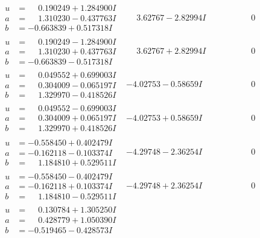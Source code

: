 \documentclass[1p]{elsarticle_modified}
\theoremstyle{definition}
\begin{document}
$$\begin{array}{c|c|c}
\begin{aligned}
u &= \phantom{-}0.190249 + 1.284900 I \\
a &= \phantom{-}1.310230 - 0.437763 I \\
b &= -0.663839 + 0.517318 I\end{aligned}
 & \phantom{-}3.62767 - 2.82994 I & \phantom{-0.000000 } 0 \\ \hline\begin{aligned}
u &= \phantom{-}0.190249 - 1.284900 I \\
a &= \phantom{-}1.310230 + 0.437763 I \\
b &= -0.663839 - 0.517318 I\end{aligned}
 & \phantom{-}3.62767 + 2.82994 I & \phantom{-0.000000 } 0 \\ \hline\begin{aligned}
u &= \phantom{-}0.049552 + 0.699003 I \\
a &= \phantom{-}0.304009 - 0.065197 I \\
b &= \phantom{-}1.329970 - 0.418526 I\end{aligned}
 & -4.02753 - 0.58659 I & \phantom{-0.000000 } 0 \\ \hline\begin{aligned}
u &= \phantom{-}0.049552 - 0.699003 I \\
a &= \phantom{-}0.304009 + 0.065197 I \\
b &= \phantom{-}1.329970 + 0.418526 I\end{aligned}
 & -4.02753 + 0.58659 I & \phantom{-0.000000 } 0 \\ \hline\begin{aligned}
u &= -0.558450 + 0.402479 I \\
a &= -0.162118 - 0.103374 I \\
b &= \phantom{-}1.184810 + 0.529511 I\end{aligned}
 & -4.29748 - 2.36254 I & \phantom{-0.000000 } 0 \\ \hline\begin{aligned}
u &= -0.558450 - 0.402479 I \\
a &= -0.162118 + 0.103374 I \\
b &= \phantom{-}1.184810 - 0.529511 I\end{aligned}
 & -4.29748 + 2.36254 I & \phantom{-0.000000 } 0 \\ \hline\begin{aligned}
u &= \phantom{-}0.130784 + 1.305250 I \\
a &= \phantom{-}0.428779 + 1.050390 I \\
b &= -0.519465 - 0.428573 I\end{aligned}

\end{array}$$
\end{document}
